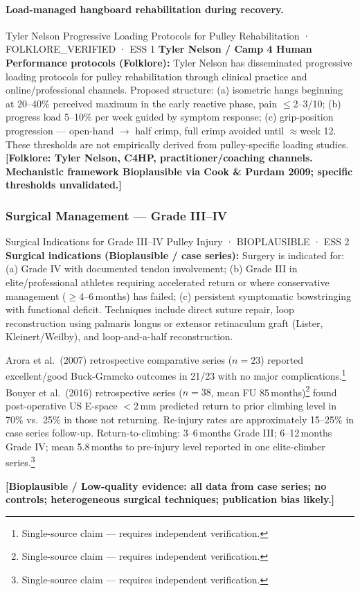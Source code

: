 \paragraph{Load-managed hangboard rehabilitation during recovery.}\leavevmode

\begin{folklorebox}{Tyler Nelson Progressive Loading Protocols for Pulley Rehabilitation · FOLKLORE\_VERIFIED · ESS 1}
\textbf{Tyler Nelson / Camp 4 Human Performance protocols (Folklore):} Tyler Nelson has disseminated progressive loading protocols for pulley rehabilitation through clinical practice and online/professional channels. Proposed structure: (a) isometric hangs beginning at 20--40\% perceived maximum in the early reactive phase, pain $\leq$2--3/10; (b) progress load 5--10\% per week guided by symptom response; (c) grip-position progression --- open-hand $\to$ half crimp, full crimp avoided until $\approx$week 12. These thresholds are not empirically derived from pulley-specific loading studies. \textbf{[Folklore: Tyler Nelson, C4HP, practitioner/coaching channels. Mechanistic framework Bioplausible via Cook \& Purdam 2009; specific thresholds unvalidated.]}
\end{folklorebox}

\subsubsection{Surgical Management --- Grade III--IV}

\begin{bioplausbox}{Surgical Indications for Grade III--IV Pulley Injury · BIOPLAUSIBLE · ESS 2}
\textbf{Surgical indications (Bioplausible / case series):} Surgery is indicated for: (a) Grade IV with documented tendon involvement; (b) Grade III in elite/professional athletes requiring accelerated return or where conservative management ($\geq$4--6\,months) has failed; (c) persistent symptomatic bowstringing with functional deficit. Techniques include direct suture repair, loop reconstruction using palmaris longus or extensor retinaculum graft (Lister, Kleinert/Weilby), and loop-and-a-half reconstruction.

Arora et al.\ (2007) retrospective comparative series ($n=23$) reported excellent/good Buck-Gramcko outcomes in 21/23 with no major complications.\footnote{Single-source claim --- requires independent verification.} Bouyer et al.\ (2016) retrospective series ($n=38$, mean FU 85\,months)\footnote{Single-source claim --- requires independent verification.} found post-operative US E-space $<$2\,mm predicted return to prior climbing level in 70\% vs.\ 25\% in those not returning. Re-injury rates are approximately 15--25\% in case series follow-up. Return-to-climbing: 3--6\,months Grade III; 6--12\,months Grade IV; mean 5.8\,months to pre-injury level reported in one elite-climber series.\footnote{Single-source claim --- requires independent verification.}

\textbf{[Bioplausible / Low-quality evidence: all data from case series; no controls; heterogeneous surgical techniques; publication bias likely.]}
\end{bioplausbox}

